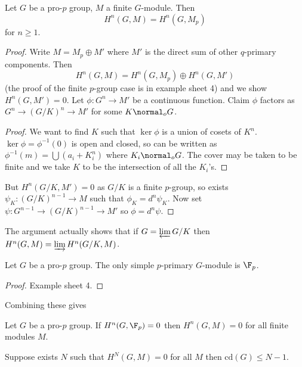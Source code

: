 \documentclass[a4paper]{article}
\begin{document}
\begin{proposition}
  Let \(G\) be a pro-\(p\) group, \(M\) a finite \(G\)-module. Then
  \[
    H^n(G, M) = H^n(G, M_p)
  \]
  for \(n \geq 1\).
\end{proposition}

\begin{proof}
  Write \(M = M_p \oplus M'\) where \(M'\) is the direct sum of other \(q\)-primary components. Then
  \[
    H^n(G, M) = H^n(G, M_p) \oplus H^n(G, M')
  \]
  (the proof of the finite \(p\)-group case is in example sheet 4) and we show \(H^n(G, M') = 0\). Let \(\phi: G^n \to M'\) be a continuous function. Claim \(\phi\) factors as \(G^n \to (G/K)^n \to M'\) for some \(K \normal_o G\).

  \begin{proof}
    We want to find \(K\) such that \(\ker \phi\) is a union of cosets of \(K^n\). \(\ker \phi = \phi^{-1}(0)\) is open and closed, so can be written as \(\phi^{-1}(m) = \bigcup (a_i + K_i^n)\) where \(K_i \normal_o G\). The cover may be taken to be finite and we take \(K\) to be the intersection of all the \(K_i\)'s.
  \end{proof}

  But \(H^n(G/K, M') = 0\) as \(G/K\) is a finite \(p\)-group, so exists \(\psi_K: (G/K)^{n - 1} \to M\) such that \(\phi_K = d^n\psi_K\). Now set \(\psi: G^{n - 1} \to (G/K)^{n - 1} \to M'\) so \(\phi = d^n \psi\).
\end{proof}

\begin{remark}
  The argument actually shows that if \(G = \varprojlim G/K\) then \(H^n(G, M) = \varinjlim H^n(G/K, M)\).
\end{remark}

\begin{proposition}
  Let \(G\) be a pro-\(p\) group. The only simple \(p\)-primary \(G\)-module is \(\F_p\).
\end{proposition}

\begin{proof}
  Example sheet 4.
\end{proof}

Combining these gives

\begin{proposition}
  Let \(G\) be a pro-\(p\) group. If \(H^n(G, \F_p) = 0\) then \(H^n(G, M) = 0\) for all finite modules \(M\).
\end{proposition}

\begin{proposition}
  Suppose exists \(N\) such that \(H^N(G, M) = 0\) for all \(M\) then \(\mathrm{cd}(G) \leq N - 1\).
\end{proposition}
\end{document}
